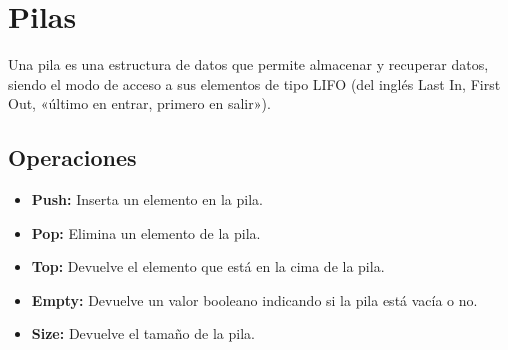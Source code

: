 \documentclass[../main.tex]{subfiles}
\begin{document}
\section{Pilas} 
        
    Una pila es una estructura de datos que permite almacenar y recuperar datos, siendo el modo de acceso a sus elementos de tipo LIFO (del inglés Last In, First Out, «último en entrar, primero en salir»).

    \subsection{Operaciones}
        \begin{itemize}
            \item \textbf{Push:} Inserta un elemento en la pila.
            \item \textbf{Pop:} Elimina un elemento de la pila.
            \item \textbf{Top:} Devuelve el elemento que está en la cima de la pila.
            \item \textbf{Empty:} Devuelve un valor booleano indicando si la pila está vacía o no.
            \item \textbf{Size:} Devuelve el tamaño de la pila.
        \end{itemize}


        
\end{document}
